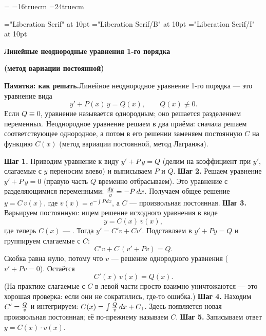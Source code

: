\magnification=
\hsize=16truecm
\vsize=24truecm
\parindent=0pt
\baselineskip=14pt
\raggedright
{}

\font\tenrm="Liberation Serif" at 10pt
\font\tenbf="Liberation Serif/B" at 10pt
\font\tenit="Liberation Serif/I" at 10pt
\rm

\def\boxnum#1{\hbox{\vrule\vbox{\hrule\hbox{\strut\kern5pt{\bf#1}\kern5pt}\hrule}\vrule}}

\def\problem#1#2{\vskip0pt plus 60pt\penalty-400\bigskip
  \line{\boxnum{#1}\quad #2\hfil}\nobreak\smallskip}
\def\st#1{\medskip\noindent{\bf #1}\enspace\ignorespaces}
\def\ans#1{\medskip\noindent\hbox{\vrule\vbox{\hrule\hbox{\strut\kern5pt{\bf Ответ:}\enspace$\displaystyle #1$\kern5pt}\hrule}\vrule}\par}

\centerline{\bf Линейные неоднородные уравнения 1-го порядка}
\centerline{\bf (метод вариации постоянной)}
\bigskip

{\bf Памятка: как решать.}\quad Линейное неоднородное уравнение 1-го порядка
--- это уравнение вида
$$y'+P(x)\,y=Q(x),\qquad Q(x)\not\equiv0.$$
Если $Q\equiv0$, уравнение называется однородным; оно решается разделением
переменных. Неоднородное уравнение решаем в два приёма: сначала решаем
соответствующее однородное, а потом в его решении заменяем постоянную $C$
на функцию $C(x)$ (метод вариации постоянной, метод Лагранжа).
\medskip

{\bf Шаг 1.} Приводим уравнение к виду $y'+P\,y=Q$ (делим на коэффициент при
$y'$, слагаемые с $y$ переносим влево) и выписываем $P$ и $Q$.
\smallskip
{\bf Шаг 2.} Решаем  уравнение $y'+P\,y=0$ (правую часть
$Q$ временно отбрасываем). Это уравнение с разделяющимися переменными:
${dy\over y}=-P\,dx$. Получаем общее решение $y=C\,v(x)$, где
$v(x)=e^{-\int P\,dx}$, а $C$ --- произвольная постоянная.
\smallskip
{\bf Шаг 3.} Варьируем постоянную: ищем решение исходного уравнения в виде
$$y=C(x)\,v(x),$$
где теперь $C(x)$ --- . Тогда
$y'=C'v+Cv'$. Подставляем в $y'+Py=Q$ и группируем слагаемые с $C$:
$$C'v+C\,(v'+Pv)=Q.$$
Скобка равна нулю, потому что $v$ --- решение однородного уравнения
($v'+Pv=0$). Остаётся
$$C'(x)\,v(x)=Q(x).$$
(На практике слагаемые с $C$ в левой части просто взаимно уничтожаются ---
это хорошая проверка: если они не сократились, где-то ошибка.)
\smallskip
{\bf Шаг 4.} Находим $C'={Q\over v}$ и интегрируем:
$C(x)=\int{Q\over v}\,dx+C_1$. Здесь появляется новая произвольная
постоянная; её по-прежнему называем $C$.
\smallskip
{\bf Шаг 5.} Записываем ответ $y=C(x)\cdot v(x)$.
\medskip

